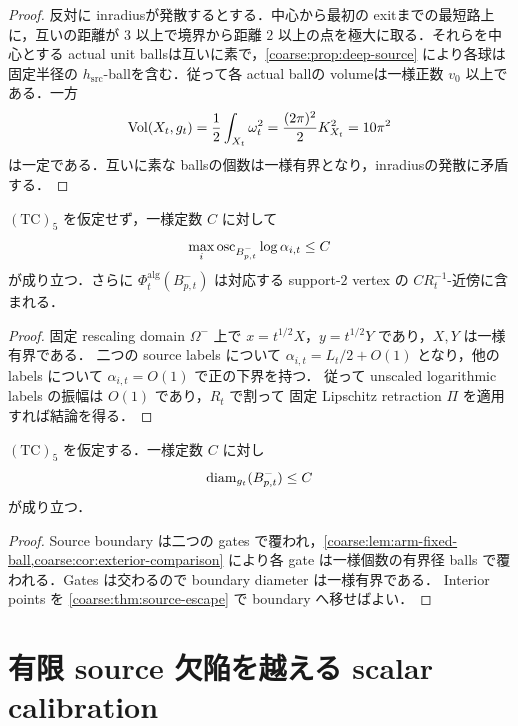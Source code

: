 \documentclass[a4paper,11pt]{ltjsarticle}
\numberwithin{equation}{section}
\theoremstyle{plain}
\theoremstyle{definition}
\theoremstyle{remark}
\begin{document}
\begin{proof}
反対に inradiusが発散するとする．中心から最初の exitまでの最短路上に，互いの距離が $3$ 以上で境界から距離 $2$ 以上の点を極大に取る．それらを中心とする actual unit ballsは互いに素で，\cref{coarse:prop:deep-source} により各球は固定半径の $h_{\mathrm{src}}$-ballを含む．従って各 actual ballの volumeは一様正数 $v_0$ 以上である．一方
\[
 \operatorname{Vol}(X_t,g_t)=\frac12\int_{X_t}\omega_t^2
 =\frac{(2\pi)^2}{2}K_{X_t}^2=10\pi^2
\]
は一定である．互いに素な ballsの個数は一様有界となり，inradiusの発散に矛盾する．
\end{proof}

\begin{lemma}\label{coarse:lem:source-labels}
$\mathrm{(TC)}_5$ を仮定せず，一様定数 $C$ に対して
\[
 \max_i\operatorname{osc}_{B_{p,t}^-}\log\alpha_{i,t}\le C
\]
が成り立つ．さらに $\Phi_t^{\mathrm{alg}}(B_{p,t}^-)$ は対応する support-$2$ vertex の
$CR_t^{-1}$-近傍に含まれる．
\end{lemma}

\begin{proof}
固定 rescaling domain $\Omega^-$ 上で $x=t^{1/2}X$，$y=t^{1/2}Y$ であり，$X,Y$ は一様有界である．
二つの source labels について
$\alpha_{i,t}=L_t/2+O(1)$ となり，他の labels について $\alpha_{i,t}=O(1)$ で正の下界を持つ．
従って unscaled logarithmic labels の振幅は $O(1)$ であり，$R_t$ で割って
固定 Lipschitz retraction $\Pi$ を適用すれば結論を得る．
\end{proof}

\begin{corollary}\label{coarse:cor:source-diameter}
$\mathrm{(TC)}_5$ を仮定する．一様定数 $C$ に対し
\[
 \operatorname{diam}_{g_t}(B_{p,t}^-)\le C
\]
が成り立つ．
\end{corollary}

\begin{proof}
Source boundary は二つの gates で覆われ，\cref{coarse:lem:arm-fixed-ball,coarse:cor:exterior-comparison}
により各 gate は一様個数の有界径 balls で覆われる．Gates は交わるので boundary diameter は一様有界である．
Interior points を \cref{coarse:thm:source-escape} で boundary へ移せばよい．
\end{proof}

\section{有限 source 欠陥を越える scalar calibration}\label{coarse:sec:calibration}
\end{document}
